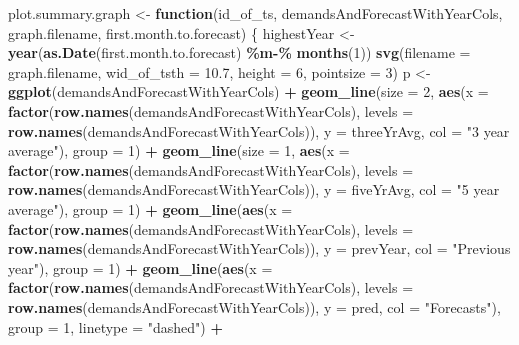 \documentclass[
]{article}
\newenvironment{Shaded}{\begin{snugshade}}{\end{snugshade}}
\newcommand{\AttributeTok}[1]{\textcolor[rgb]{0.13,0.29,0.53}{#1}}
\newcommand{\ControlFlowTok}[1]{\textcolor[rgb]{0.13,0.29,0.53}{\textbf{#1}}}
\newcommand{\DecValTok}[1]{\textcolor[rgb]{0.00,0.00,0.81}{#1}}
\newcommand{\FloatTok}[1]{\textcolor[rgb]{0.00,0.00,0.81}{#1}}
\newcommand{\FunctionTok}[1]{\textcolor[rgb]{0.13,0.29,0.53}{\textbf{#1}}}
\newcommand{\NormalTok}[1]{#1}
\newcommand{\OtherTok}[1]{\textcolor[rgb]{0.56,0.35,0.01}{#1}}
\newcommand{\SpecialCharTok}[1]{\textcolor[rgb]{0.81,0.36,0.00}{\textbf{#1}}}
\newcommand{\StringTok}[1]{\textcolor[rgb]{0.31,0.60,0.02}{#1}}
\begin{document}
\begin{Shaded}
\begin{Highlighting}[]
\NormalTok{plot.summary.graph }\OtherTok{\textless{}{-}} \ControlFlowTok{function}\NormalTok{(id\_of\_ts, demandsAndForecastWithYearCols, graph.filename, first.month.to.forecast) \{}
\NormalTok{  highestYear }\OtherTok{\textless{}{-}} \FunctionTok{year}\NormalTok{(}\FunctionTok{as.Date}\NormalTok{(first.month.to.forecast) }\SpecialCharTok{\%m{-}\%} \FunctionTok{months}\NormalTok{(}\DecValTok{1}\NormalTok{))}
  \FunctionTok{svg}\NormalTok{(}\AttributeTok{filename =}\NormalTok{ graph.filename, }\AttributeTok{wid\_of\_tsth =} \FloatTok{10.7}\NormalTok{, }\AttributeTok{height =} \DecValTok{6}\NormalTok{, }\AttributeTok{pointsize =} \DecValTok{3}\NormalTok{)}
\NormalTok{  p }\OtherTok{\textless{}{-}} \FunctionTok{ggplot}\NormalTok{(demandsAndForecastWithYearCols) }\SpecialCharTok{+}
    \FunctionTok{geom\_line}\NormalTok{(}\AttributeTok{size =} \DecValTok{2}\NormalTok{, }\FunctionTok{aes}\NormalTok{(}\AttributeTok{x =} \FunctionTok{factor}\NormalTok{(}\FunctionTok{row.names}\NormalTok{(demandsAndForecastWithYearCols), }\AttributeTok{levels =} \FunctionTok{row.names}\NormalTok{(demandsAndForecastWithYearCols)), }\AttributeTok{y =}\NormalTok{ threeYrAvg, }\AttributeTok{col =} \StringTok{"3 year average"}\NormalTok{), }\AttributeTok{group =} \DecValTok{1}\NormalTok{) }\SpecialCharTok{+}
    \FunctionTok{geom\_line}\NormalTok{(}\AttributeTok{size =} \DecValTok{1}\NormalTok{, }\FunctionTok{aes}\NormalTok{(}\AttributeTok{x =} \FunctionTok{factor}\NormalTok{(}\FunctionTok{row.names}\NormalTok{(demandsAndForecastWithYearCols), }\AttributeTok{levels =} \FunctionTok{row.names}\NormalTok{(demandsAndForecastWithYearCols)), }\AttributeTok{y =}\NormalTok{ fiveYrAvg, }\AttributeTok{col =} \StringTok{"5 year average"}\NormalTok{), }\AttributeTok{group =} \DecValTok{1}\NormalTok{) }\SpecialCharTok{+}
    \FunctionTok{geom\_line}\NormalTok{(}\FunctionTok{aes}\NormalTok{(}\AttributeTok{x =} \FunctionTok{factor}\NormalTok{(}\FunctionTok{row.names}\NormalTok{(demandsAndForecastWithYearCols), }\AttributeTok{levels =} \FunctionTok{row.names}\NormalTok{(demandsAndForecastWithYearCols)), }\AttributeTok{y =}\NormalTok{ prevYear, }\AttributeTok{col =} \StringTok{"Previous year"}\NormalTok{), }\AttributeTok{group =} \DecValTok{1}\NormalTok{) }\SpecialCharTok{+}
    \FunctionTok{geom\_line}\NormalTok{(}\FunctionTok{aes}\NormalTok{(}\AttributeTok{x =} \FunctionTok{factor}\NormalTok{(}\FunctionTok{row.names}\NormalTok{(demandsAndForecastWithYearCols), }\AttributeTok{levels =} \FunctionTok{row.names}\NormalTok{(demandsAndForecastWithYearCols)), }\AttributeTok{y =}\NormalTok{ pred, }\AttributeTok{col =} \StringTok{"Forecasts"}\NormalTok{), }\AttributeTok{group =} \DecValTok{1}\NormalTok{, }\AttributeTok{linetype =} \StringTok{"dashed"}\NormalTok{) }\SpecialCharTok{+}

\end{Highlighting}
\end{Shaded}
\end{document}
